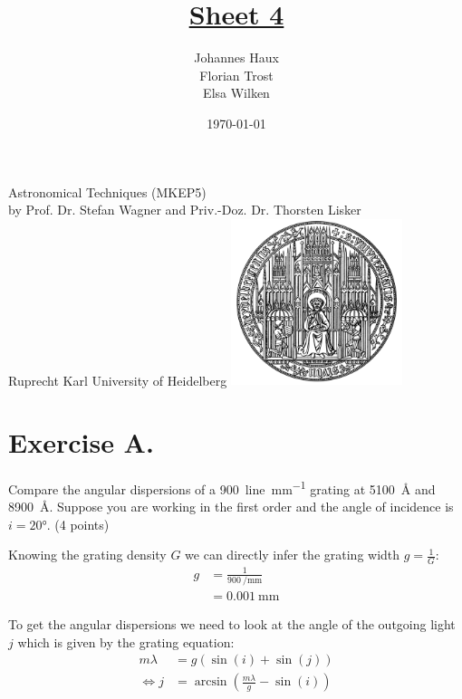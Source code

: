 \documentclass[11pt,a4paper,twoside]{article}
\title{\LARGE \underline {Sheet 4}}
\author{Johannes Haux \\ Florian Trost \\ Elsa Wilken}
\date{\today}
\begin{document}
\maketitle
\thispagestyle{empty}

\begin{center}
  Astronomical Techniques (MKEP5) \\
  \baselineskip35pt
  by Prof. Dr. Stefan Wagner and Priv.-Doz. Dr. Thorsten Lisker \\
  \baselineskip60pt
  Ruprecht Karl University of Heidelberg
\vskip 40pt
\includegraphics[width=5cm]{UniHD.png}

\end{center}

\newpage
\setcounter{page}{1}		%

\section*{Exercise A.}

Compare the angular dispersions of a \SI{900}{line\per\milli\meter} grating at 
\SI{5100}{\angstrom} and \SI{8900}{\angstrom}. Suppose you are working in the 
first order and the angle of incidence is $i = \ang{20}$. (4 points)
\newline

Knowing the grating density $G$ we can directly infer the grating width $g = 
\frac{1}{G}$:
\begin{align}
    g   &= \frac{1}{\SI{900}{\per\milli\meter}} \\
        &= \SI{0.001}{\milli\meter}
\end{align}

To get the angular dispersions we need to look at the angle of the outgoing
light $j$ which is given by the grating equation:
\begin{align}
    m\lambda &= g\left( \sin(i) + \sin(j) \right)  \\
    \Leftrightarrow j &= \arcsin\left( \frac{m\lambda}{g} - \sin(i)\right)
\end{align}
\end{document}
